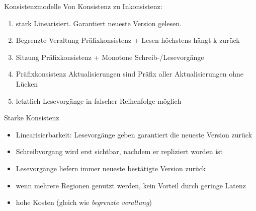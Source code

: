 \begin{flashcard}[Definition]{Konsistenzmodelle}
    Von Konsistenz zu Inkonsistenz:
    \begin{enumerate}
        \item stark\newline
            Linearisiert. Garantiert neueste Version gelesen.
        \item Begrenzte Veraltung\newline
            Präfixkonsistenz + Lesen höchstens hängt k zurück
        \item Sitzung\newline
            Präfixkonsistenz + Monotone Schreib-/Lesevorgänge
        \item Präfixkonsistenz\newline
            Aktualisierungen sind Präfix aller Aktualisierungen ohne Lücken
        \item letztlich\newline
            Lesevorgänge in falscher Reihenfolge möglich
    \end{enumerate}
\end{flashcard}

\begin{flashcard}[Definition]{Starke Konsistenz}
    \begin{itemize}
        \item Linearisierbarkeit:\newline
            Lesevorgänge geben garantiert die neueste Version zurück
        \item Schreibvorgang wird erst sichtbar, nachdem er repliziert worden ist
        \item Lesevorgänge liefern immer neueste bestätigte Version zurück
        \item wenn mehrere Regionen genutzt werden, kein Vorteil durch geringe Latenz
        \item hohe Kosten (gleich wie \emph{begrenzte veraltung})
    \end{itemize}
\end{flashcard}

